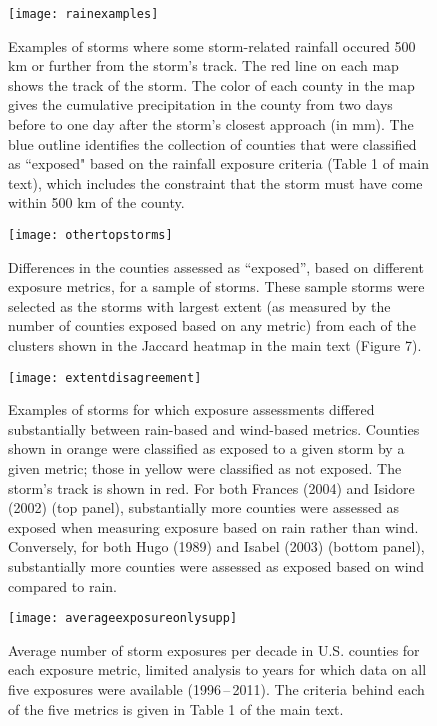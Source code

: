 \documentclass[11pt, titlepage, twoside]{article}
\begin{document}
\begin{figure}[tbhp!]
\centering
\texttt{[image: rainexamples]}
\caption{Examples of storms where some storm-related rainfall occured
         500 \si{\kilo\metre} or further from the storm's track. 
	 The red line on each map shows the track of the storm. 
	 The color of each county in the map gives the cumulative 
	 precipitation in the county from two days before to one day after
	 the storm's closest approach (in \si{\milli\metre}). The blue 
	 outline identifies the collection of counties
	 that were classified as ``exposed" based on the rainfall exposure 
	 criteria (Table 1 of main text), which includes the constraint
	 that the storm must have come within 500 \si{\kilo\metre} of the 
	 county. }
\label{fig:rainexamples}
\end{figure}

\begin{figure}[tbhp!]
\centering
\texttt{[image: othertopstorms]}
\caption{Differences in the counties assessed as ``exposed'', based on different
	exposure metrics, for a sample of storms. These sample storms were 
	selected as the  storms with largest extent (as measured by the 
	number of counties exposed based on any metric) from each of the 
	clusters shown in the Jaccard heatmap in the main text (Figure 7).}
\label{fig:othertopstorms}
\end{figure}

\clearpage

\begin{figure}[tbhp!]
\centering
\texttt{[image: extentdisagreement]}
\caption{Examples of storms for which exposure assessments differed
	substantially between rain-based and wind-based metrics. Counties 
	shown in orange were classified as exposed to a given storm by a 
	given metric; those in yellow were classified as not exposed. 
	The storm's track is shown in red. For both Frances (2004) and 
	Isidore (2002) (top panel), substantially more counties were assessed 
	as exposed when measuring exposure based on rain rather than wind. 
	Conversely, for both Hugo (1989) and Isabel (2003) (bottom panel), 
	substantially more counties were assessed as exposed based on wind 
	compared to rain.}
\label{fig:extentdisagreement}
\end{figure}

\clearpage

\begin{figure}[tbhp!]
\centering
\texttt{[image: averageexposureonlysupp]}
\caption{Average number of storm exposures per decade in U.S. counties for each 
	exposure metric, limited analysis to years for which data on all five 
	exposures were available (1996\,--\,2011). The criteria behind each of 
	the five metrics is given in Table 1 of the main text. 	
	} 
\label{fig:averageexposuresupp}
\end{figure}
\end{document}
